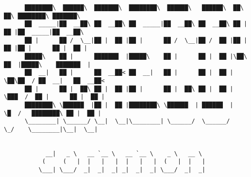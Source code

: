 \documentclass[varwidth=\maxdimen,margin=0.5cm,multi={verbatim}]{standalone}
\begin{document}
\begin{verbatim}
      ████████\  ██████\  ███████\  ████████\  ██████\   ██████\  ██\    ██\ ████████\ ███████\
      ██  _____|██  __██\ ██  __██\ ██  _____|██  __██\ ██  __██\ ██ |   ██ |██  _____|██  __██\
      ██ |      ██ /  \__|██ |  ██ |██ |      ██ /  \__|██ /  ██ |██ |   ██ |██ |      ██ |  ██ |
      █████\    ██ |      ███████  |█████\    ██ |      ██ |  ██ |\██\  ██  |█████\    ███████  |
      ██  __|   ██ |      ██  __██< ██  __|   ██ |      ██ |  ██ | \██\██  / ██  __|   ██  __██<
      ██ |      ██ |  ██\ ██ |  ██ |██ |      ██ |  ██\ ██ |  ██ |  \███  /  ██ |      ██ |  ██ |
      ████████\ \██████  |██ |  ██ |████████\ \██████  | ██████  |   \█  /   ████████\ ██ |  ██ |
      \________| \______/ \__|  \__|\________| \______/  \______/     \_/    \________|\__|  \__|


            __|   _ \   __ `__ \   __ `__ \    _ \   __ \
           (     (   |  |   |   |  |   |   |  (   |  |   |
          \___| \___/  _|  _|  _| _|  _|  _| \___/  _|  _|




\end{verbatim}
\end{document}
